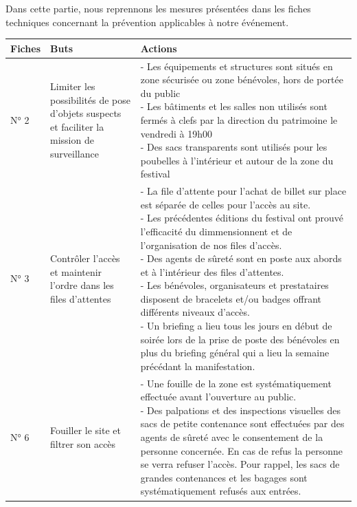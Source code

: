 \documentclass[hidelinks, paper=a4, fontsize=13pt]{report}
\begin{document}
Dans cette partie, nous reprennons les mesures présentées dans les fiches techniques concernant la prévention applicables à notre événement.
\begin{center}
\begin{tabular}{| p{1.5cm} | p{4cm} | p{10cm} |}
\shrinkheight{1cm} 
  \hline
  \cellcolor[gray]{0.9} \textbf{Fiches} & \cellcolor[gray]{0.9} \textbf{Buts} & \cellcolor[gray]{0.9} \textbf{Actions} \\
  \hline
  N° 2 & 
  \parbox[t]{4cm}{Limiter les possibilités de pose d'objets suspects et faciliter la mission de surveillance} & 
  \parbox[t]{10cm}{- Les équipements et structures sont situés en zone sécurisée ou zone bénévoles, hors de portée du public\\
  - Les bâtiments et les salles non utilisés sont fermés à clefs par la direction du patrimoine le vendredi à 19h00\\
  - Des sacs transparents sont utilisés pour les poubelles à l'intérieur et autour de la zone du festival\\}
 \\
 \hline
  N° 3 &
  \parbox[t]{4cm}{Contrôler l'accès et maintenir l'ordre dans les files d'attentes} & 
  \parbox[t]{10cm}{- La file d'attente pour l'achat de billet sur place est séparée de celles pour l'accès au site.\\
  - Les précédentes éditions du festival ont prouvé l'efficacité du dimmensionnent et de l'organisation de nos files d'accès.\\
  - Des agents de sûreté sont en poste aux abords et à l'intérieur des files d'attentes.\\
  - Les bénévoles, organisateurs et prestataires disposent de bracelets et/ou badges offrant différents niveaux d'accès.\\
  - Un briefing a lieu tous les jours en début de soirée lors de la prise de poste des bénévoles en plus du briefing général qui a lieu la semaine précédant la manifestation.\\}
 \\
 \hline
  N° 6 &
  \parbox[t]{4cm}{Fouiller le site et filtrer son accès} & 
  \parbox[t]{10cm}{- Une fouille de la zone est systématiquement effectuée avant l'ouverture au public.\\
  - Des palpations et des inspections visuelles des sacs de petite contenance sont effectuées par des agents de sûreté avec le consentement de la personne concernée. En cas de refus la personne se verra refuser l'accès. Pour rappel, les sacs de grandes contenances et les bagages sont systématiquement refusés aux entrées.\\}

\end{tabular}
\end{center}
\end{document}
